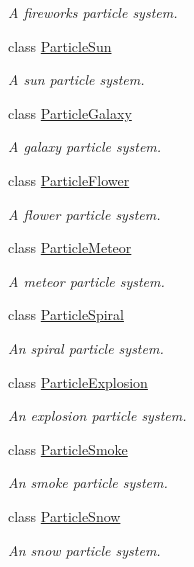 \begin{DoxyCompactItemize}
\begin{DoxyCompactList}\small\item\em A fireworks particle system. \end{DoxyCompactList}\item 
class \hyperlink{classParticleSun}{Particle\+Sun}
\begin{DoxyCompactList}\small\item\em A sun particle system. \end{DoxyCompactList}\item 
class \hyperlink{classParticleGalaxy}{Particle\+Galaxy}
\begin{DoxyCompactList}\small\item\em A galaxy particle system. \end{DoxyCompactList}\item 
class \hyperlink{classParticleFlower}{Particle\+Flower}
\begin{DoxyCompactList}\small\item\em A flower particle system. \end{DoxyCompactList}\item 
class \hyperlink{classParticleMeteor}{Particle\+Meteor}
\begin{DoxyCompactList}\small\item\em A meteor particle system. \end{DoxyCompactList}\item 
class \hyperlink{classParticleSpiral}{Particle\+Spiral}
\begin{DoxyCompactList}\small\item\em An spiral particle system. \end{DoxyCompactList}\item 
class \hyperlink{classParticleExplosion}{Particle\+Explosion}
\begin{DoxyCompactList}\small\item\em An explosion particle system. \end{DoxyCompactList}\item 
class \hyperlink{classParticleSmoke}{Particle\+Smoke}
\begin{DoxyCompactList}\small\item\em An smoke particle system. \end{DoxyCompactList}\item 
class \hyperlink{classParticleSnow}{Particle\+Snow}
\begin{DoxyCompactList}\small\item\em An snow particle system. \end{DoxyCompactList}\item 

\end{DoxyCompactItemize}
